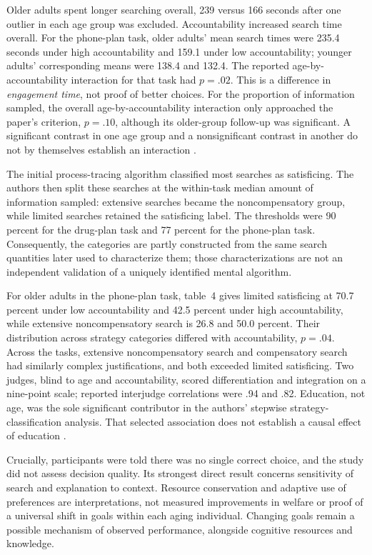 Older adults spent longer searching overall, 239 versus 166 seconds after
one outlier in each age group was excluded. Accountability increased search
time overall. For the phone-plan task, older adults' mean search times
were 235.4 seconds under high accountability and 159.1 under low
accountability; younger adults' corresponding means were 138.4 and 132.4.
The reported age-by-accountability interaction for that task had
\(p=.02\). This is a difference in \emph{engagement time}, not proof of
better choices. For the proportion of information sampled, the overall
age-by-accountability interaction only approached the paper's criterion,
\(p=.10\), although its older-group follow-up was significant. A
significant contrast in one age group and a nonsignificant contrast in
another do not by themselves establish an interaction
\cite[pp.~706--707]{HessQueenEnnis2013Search}.

The initial process-tracing algorithm classified most searches as
satisficing. The authors then split these searches at the within-task
median amount of information sampled: extensive searches became the
noncompensatory group, while limited searches retained the satisficing
label. The thresholds were 90 percent for the drug-plan task and
77 percent for the phone-plan task. Consequently, the categories are
partly constructed from the same search quantities later used to
characterize them; those characterizations are not an independent
validation of a uniquely identified mental algorithm.

For older adults in the phone-plan task, table~4 gives limited satisficing
at 70.7 percent under low accountability and 42.5 percent under high
accountability, while extensive noncompensatory search is 26.8 and
50.0 percent. Their distribution across strategy categories differed with
accountability, \(p=.04\). Across the tasks, extensive noncompensatory
search and compensatory search had similarly complex justifications,
and both exceeded limited satisficing. Two judges, blind to age and
accountability, scored differentiation and integration on a nine-point
scale; reported interjudge correlations were .94 and .82. Education,
not age, was the sole significant contributor in the authors' stepwise
strategy-classification analysis. That selected association does not
establish a causal effect of education
\cite[pp.~707--709, tables~3--5]{HessQueenEnnis2013Search}.

Crucially, participants were told there was no single correct choice,
and the study did not assess decision quality. Its strongest direct result
concerns sensitivity of search and explanation to context. Resource
conservation and adaptive use of preferences are interpretations, not
measured improvements in welfare or proof of a universal shift in goals
within each aging individual. Changing goals remain a possible mechanism
of observed performance, alongside cognitive resources and knowledge.

